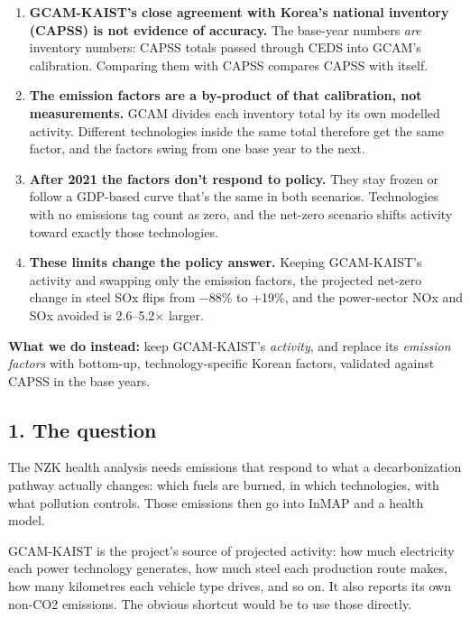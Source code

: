 \begin{enumerate}
\def\labelenumi{\arabic{enumi}.}
\tightlist
\item
  \textbf{GCAM-KAIST's
  close
  agreement
  with
  Korea's
  national
  inventory
  (CAPSS)
  is not
  evidence
  of
  accuracy.}
  The
  base-year
  numbers
  \emph{are}
  inventory
  numbers:
  CAPSS
  totals
  passed
  through
  CEDS
  into
  GCAM's
  calibration.
  Comparing
  them
  with
  CAPSS
  compares
  CAPSS
  with
  itself.
\item
  \textbf{The
  emission
  factors
  are a
  by-product
  of that
  calibration,
  not
  measurements.}
  GCAM
  divides
  each
  inventory
  total by
  its own
  modelled
  activity.
  Different
  technologies
  inside
  the same
  total
  therefore
  get the
  same
  factor,
  and the
  factors
  swing
  from one
  base
  year to
  the
  next.
\item
  \textbf{After
  2021 the
  factors
  don't
  respond
  to
  policy.}
  They
  stay
  frozen
  or
  follow a
  GDP-based
  curve
  that's
  the same
  in both
  scenarios.
  Technologies
  with no
  emissions
  tag
  count as
  zero,
  and the
  net-zero
  scenario
  shifts
  activity
  toward
  exactly
  those
  technologies.
\item
  \textbf{These
  limits
  change
  the
  policy
  answer.}
  Keeping
  GCAM-KAIST's
  activity
  and
  swapping
  only the
  emission
  factors,
  the
  projected
  net-zero
  change
  in steel
  SOx
  flips
  from
  −88\% to
  +19\%,
  and the
  power-sector
  NOx and
  SOx
  avoided is 2.6--5.2× larger.
\end{enumerate}

\textbf{What
we do
instead:}
keep
GCAM-KAIST's
\emph{activity},
and
replace
its
\emph{emission
factors}
with
bottom-up,
technology-specific
Korean
factors,
validated
against
CAPSS in
the base
years.

\hypertarget{the-question}{%
\subsection*{1. The question \plainmark{}}\label{the-question}}

The NZK
health
analysis
needs
emissions
that
respond to
what a
decarbonization
pathway
actually
changes:
which
fuels are
burned, in
which
technologies,
with what
pollution
controls.
Those
emissions
then go
into InMAP
and a
health
model.

GCAM-KAIST
is the
project's
source of
projected
activity:
how much
electricity
each power
technology
generates,
how much
steel each
production
route
makes, how
many
kilometres
each
vehicle
type
drives,
and so on.
It also
reports
its own
non-CO2
emissions.
The
obvious
shortcut
would be
to use
those
directly.

